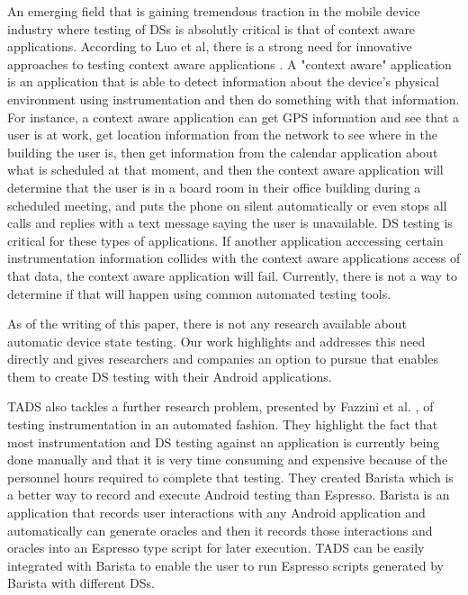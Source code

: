 An emerging field that is gaining tremendous traction in the mobile device industry where testing of DSs is absolutly critical is that of context aware applications.
According to Luo et al, there is a strong need for innovative approaches to testing context aware applications \cite{Luo:2017:TLT:3139486.3130945}.  A "context aware" application is an application that is able to detect information about the device's physical environment using instrumentation and then do something with that information.  For instance, a context aware application can get GPS information and see that a user is at work, get location information from the network to see where in the building the user is, then get information from the calendar application about what is scheduled at that moment, and then the context aware application will determine that the user is in a board room in their office building during a scheduled meeting, and puts the phone on silent automatically or even stops all calls and replies with a text message saying the user is unavailable. DS testing is critical for these types of applications.  If another application acccessing certain instrumentation information collides with the context aware applications access of that data, the context aware application will fail. Currently, there is not a way to determine if that will happen using common automated testing tools. 

As of the writing of this paper, there is not any research available about automatic device state testing.  Our work highlights and addresses this need directly and gives researchers and companies an option to pursue that enables them to create DS testing with their Android applications.

TADS also tackles a further research problem, presented by Fazzini et al. \cite{7927971}, of testing instrumentation in an automated fashion.  They highlight the fact that most instrumentation and DS testing against an application is currently being done manually and that it is very time consuming and expensive because of the personnel hours required to complete that testing. They created Barista which is a better way to record and execute Android testing than Espresso.  Barista is an application that records user interactions with any Android application and automatically can generate oracles and then it records those interactions and oracles into an Espresso type script for later execution.  TADS can be easily integrated with Barista to enable the user to run Espresso scripts generated by Barista with different DSs.

